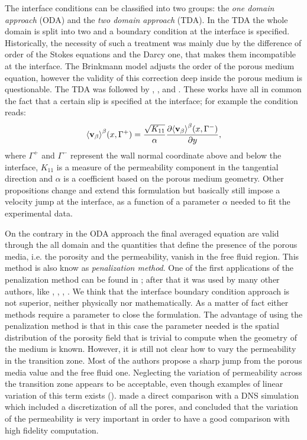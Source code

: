 The interface conditions can be classified into two groups: the \textit{one domain approach} (ODA) and the \textit{two domain approach} (TDA).
In the TDA the whole domain is split into two and a boundary condition at the interface is specified. Historically, the necessity of such a treatment was mainly due by the difference of order of the Stokes equations and the Darcy one, that makes them incompatible at the interface.
The Brinkmann model adjusts the order of the porous medium equation, however the validity of this correction deep inside the porous medium is questionable.
The TDA was followed by \citet{beavers1967boundary}, \citet{mikelic2000interface}, \citet{ochoa1995momentum} and \citet{le2006interfacial}.
These works have all in common the fact that a certain slip is specified at the interface; for example the \citet{beavers1967boundary} condition reads:
$$
{\left< \textbf{v}_{\beta} \right>}^{\beta}(x,\Gamma^+) = \dfrac{\sqrt{K_{11}}}{\alpha} \dfrac{\partial {\left< \textbf{v}_{\beta}\right>}^{\beta}(x, \Gamma^-)}{\partial y},
$$
where $\Gamma^+$ and $\Gamma^-$ represent the wall normal coordinate above and below the interface, $K_{11}$ is a measure of the permeability component in the tangential direction and $\alpha$ is a coefficient based on the porous medium geometry.
Other propositions change and extend this formulation but basically still impose a velocity jump at the interface, as a function of a parameter $\alpha$ needed to fit the experimental data.

On the contrary in the ODA approach the final averaged equation are valid through the all domain and the quantities that define the presence of the porous media, i.e. the porosity and the permeability, vanish in the free fluid region.
This method is also know as \textit{penalization method}. One of the first applications of the penalization method can be found in \citet{caltagirone1994interaction}; after that it was used by many other authors, like \citet{bruneau2004passive}, \citet{bruneau2008numerical}, \citet{bruneau2010coupling}, \citet{hussong2011continuum}.
We think that the interface boundary condition approach is not superior, neither physically nor mathematically.
As a matter of fact either methods require a parameter to close the formulation. The advantage of using the penalization method is that in this case the parameter needed is the spatial distribution of the porosity field that is trivial to compute when the geometry of the medium is known.
However, it is still not clear how to vary the permeability in the transition zone. Most of the authors propose a sharp jump from the porous media value and the free fluid one. Neglecting the variation of permeability across the transition zone appears to be acceptable, even though examples of linear variation of this term exists (\citet{caltagirone1994interaction}).
\citet{hussong2011continuum} made a direct comparison with a DNS simulation which included a discretization of all the pores, and concluded that the variation of the permeability is very important in order to have a good comparison with high fidelity computation.


